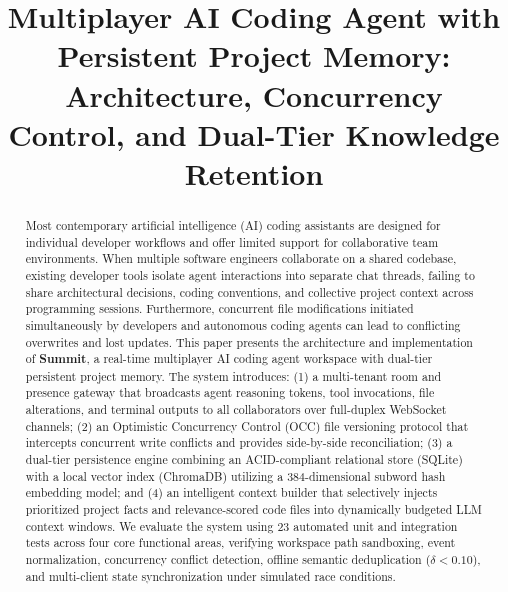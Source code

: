 \documentclass[conference]{IEEEtran}
\begin{document}
\title{Multiplayer AI Coding Agent with Persistent Project Memory: Architecture, Concurrency Control, and Dual-Tier Knowledge Retention}

\author{
}

\maketitle

\begin{abstract}
Most contemporary artificial intelligence (AI) coding assistants are designed for individual developer workflows and offer limited support for collaborative team environments. When multiple software engineers collaborate on a shared codebase, existing developer tools isolate agent interactions into separate chat threads, failing to share architectural decisions, coding conventions, and collective project context across programming sessions. Furthermore, concurrent file modifications initiated simultaneously by developers and autonomous coding agents can lead to conflicting overwrites and lost updates. This paper presents the architecture and implementation of \textbf{Summit}, a real-time multiplayer AI coding agent workspace with dual-tier persistent project memory. The system introduces: (1) a multi-tenant room and presence gateway that broadcasts agent reasoning tokens, tool invocations, file alterations, and terminal outputs to all collaborators over full-duplex WebSocket channels; (2) an Optimistic Concurrency Control (OCC) file versioning protocol that intercepts concurrent write conflicts and provides side-by-side reconciliation; (3) a dual-tier persistence engine combining an ACID-compliant relational store (SQLite) with a local vector index (ChromaDB) utilizing a 384-dimensional subword hash embedding model; and (4) an intelligent context builder that selectively injects prioritized project facts and relevance-scored code files into dynamically budgeted LLM context windows. We evaluate the system using 23 automated unit and integration tests across four core functional areas, verifying workspace path sandboxing, event normalization, concurrency conflict detection, offline semantic deduplication ($\delta < 0.10$), and multi-client state synchronization under simulated race conditions.
\end{abstract}
\end{document}
